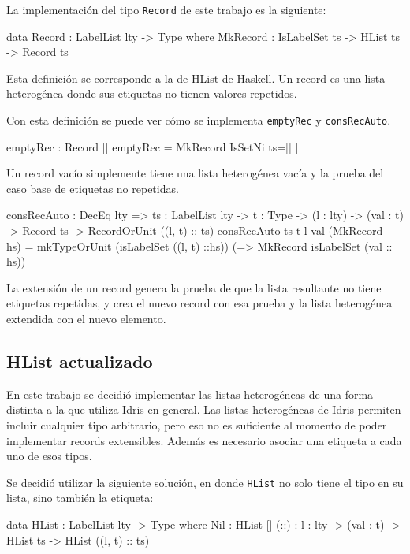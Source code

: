 La implementación del tipo \texttt{Record} de este trabajo es la siguiente:

\begin{code}
data Record : LabelList lty -> Type where
  MkRecord : IsLabelSet ts -> HList ts -> Record ts
\end{code}

Esta definición se corresponde a la de HList de Haskell. Un record es una lista heterogénea donde sus etiquetas no tienen valores repetidos.

Con esta definición se puede ver cómo se implementa \texttt{emptyRec} y \texttt{consRecAuto}.

\begin{code}
emptyRec : Record []
emptyRec = MkRecord IsSetNi {ts=[]} []
\end{code}

Un record vacío simplemente tiene una lista heterogénea vacía y la prueba del caso base de etiquetas no repetidas.

\begin{code}
consRecAuto : DecEq lty => {ts : LabelList lty} ->
  {t : Type} -> (l : lty) -> (val : t) -> Record ts ->
  RecordOrUnit ((l, t) :: ts)
consRecAuto {ts} {t} l val (MkRecord _ hs) =
  mkTypeOrUnit (isLabelSet ((l, t) ::hs))
  (\isLabelSet => MkRecord isLabelSet (val :: hs))
\end{code}

La extensión de un record genera la prueba de que la lista resultante no tiene etiquetas repetidas, y crea el nuevo record con esa prueba y la lista heterogénea extendida con el nuevo elemento.

\subsection{HList actualizado}

En este trabajo se decidió implementar las listas heterogéneas de una forma distinta a la que utiliza Idris en general. Las listas heterogéneas de Idris permiten incluir cualquier tipo arbitrario, pero eso no es suficiente al momento de poder implementar records extensibles. Además es necesario asociar una etiqueta a cada uno de esos tipos.

Se decidió utilizar la siguiente solución, en donde \texttt{HList} no solo tiene el tipo en su lista, sino también la etiqueta:

\begin{code}
data HList : LabelList lty -> Type where
  Nil : HList []
  (::) : {l : lty} -> (val : t) -> HList ts ->
    HList ((l, t) :: ts)
\end{code}


